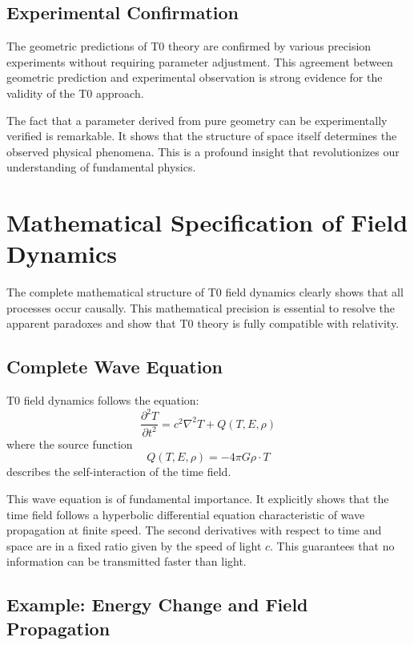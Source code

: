 	\subsection{Experimental Confirmation}
	
	The geometric predictions of T0 theory are confirmed by various precision experiments without requiring parameter adjustment. This agreement between geometric prediction and experimental observation is strong evidence for the validity of the T0 approach.
	
	The fact that a parameter derived from pure geometry can be experimentally verified is remarkable. It shows that the structure of space itself determines the observed physical phenomena. This is a profound insight that revolutionizes our understanding of fundamental physics.
	
	\section{Mathematical Specification of Field Dynamics}
	
	The complete mathematical structure of T0 field dynamics clearly shows that all processes occur causally. This mathematical precision is essential to resolve the apparent paradoxes and show that T0 theory is fully compatible with relativity.
	
	\subsection{Complete Wave Equation}
	
	T0 field dynamics follows the equation:
	\begin{equation}
		\frac{\partial^2 T}{\partial t^2} = c^2\nabla^2 T + Q(T, E, \rho) \label{eq:wave_equation}
	\end{equation}
	where the source function
	\begin{equation}
		Q(T, E, \rho) = -4\pi G \rho \cdot T
	\end{equation}
	describes the self-interaction of the time field.
	
	This wave equation is of fundamental importance. It explicitly shows that the time field follows a hyperbolic differential equation characteristic of wave propagation at finite speed. The second derivatives with respect to time and space are in a fixed ratio given by the speed of light $c$. This guarantees that no information can be transmitted faster than light.
	
	\subsection{Example: Energy Change and Field Propagation}
	
